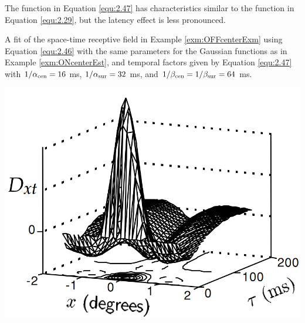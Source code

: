 \begin{rem}
   The function in Equation \ref{equ:2.47} has characteristics similar to the function in Equation \ref{equ:2.29}, but the latency effect is less pronounced.
\end{rem}

\begin{exm}
  \label{exm:OFFcenterEst}
   A fit of the space-time receptive field in Example \ref{exm:OFFcenterExm} using Equation \ref{equ:2.46} with the same parameters for the Gaussian functions as in Example \ref{exm:ONcenterEst}, and temporal factors given by Equation \ref{equ:2.47} with $1/\alpha_{\rm{cen}} = 16$ ms, $1/\alpha_{\rm{sur}} = 32$ ms, and $1/\beta_{\rm{cen}} = 1/\beta_{\rm{sur}} = 64$ ms.
  \begin{center}
    \includegraphics[scale=0.2]{./png/OFFcenterEst}
  \end{center}
\end{exm}

